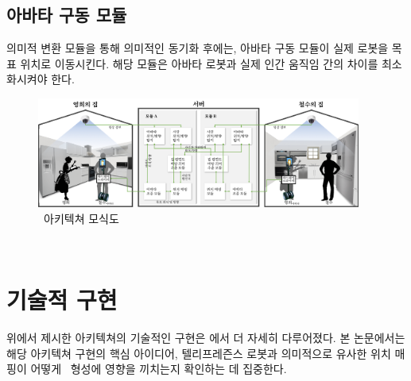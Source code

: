 
\subsection{아바타 구동 모듈}
의미적 변환 모듈을 통해 의미적인 동기화 후에는, 아바타 구동 모듈이 실제 로봇을 목표 위치로 이동시킨다. 해당 모듈은 아바타 로봇과 실제 인간 움직임 간의 차이를 최소화시켜야 한다. 



\begin{figure}
\centering
\includegraphics[width=0.95\textwidth]{images/architecture}
\caption{\sysname\ 아키텍쳐 모식도}
\label{fig:architecture}
\end{figure}

\
\section{ 기술적 구현}
\label{sec:system_implementation}
위에서 제시한 아키텍쳐의 기술적인 구현은 \cite{kang2018homemeld}에서 더 자세히 다루어졌다. 본 논문에서는 해당 아키텍쳐 구현의 핵심 아이디어, 텔리프레즌스 로봇과 의미적으로 유사한 위치 매핑이 어떻게 \concept\ 형성에 영향을 끼치는지 확인하는 데 집중한다.

